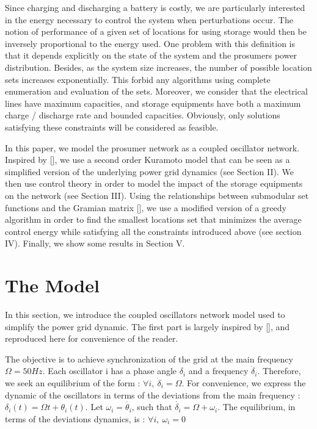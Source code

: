\documentclass[10pt,twoside%
                ,draft%
        ]{article}
\begin{document}
Since charging and discharging a battery is costly, we are particularly interested in the energy necessary to control the system when perturbations occur. The notion of performance of a given set of locations for using storage would then be inversely proportional to the energy used. One problem with this definition is that it depends explicitly on the state of the system and the prosumers power distribution. Besides, as the system size increases, the number of possible location sets increases exponentially. This forbid any algorithms using complete enumeration and evaluation of the sets.
Moreover, we consider  that the electrical lines have maximum capacities, and storage equipments have both a maximum charge / discharge rate and  bounded capacities. Obviously, only solutions satisfying these constraints will be considered as feasible.



 In this paper, we model the prosumer network as a coupled oscillator network. Inspired by [], we use a second order Kuramoto model that can be seen as a simplified version of the underlying power grid dynamics (see Section II). We then use control theory in order to model the impact of the storage equipments on the network (see Section III). Using the relationships between submodular set functions
and the Gramian matrix [], we use a modified version of a greedy algorithm in order to find the smallest locations set that minimizes the average control energy while satisfying all the constraints introduced above (see section IV).
Finally, we show some results in Section V.\section{The Model}

In this section, we introduce the coupled oscillators network model used to simplify the power grid dynamic. The first part is largely inspired by [], and reproduced here for convenience of the reader.

 The objective is to achieve synchronization of the grid at the main frequency $ \Omega = 50 Hz $. Each oscillator i has a phase angle $ \delta_i $ and a frequency $ \dot{\delta}_i $. Therefore, we seek an equilibrium of the form : $ \forall i,\ \dot{\delta}_i = \Omega $. For convenience, we express the dynamic of the oscillators in terms of the deviations from the main frequency : $ \delta_i(t) = \Omega t + \theta_i(t) $. Let $ \omega_i = \dot{\theta_i} $, such that $ \dot{\delta_i} = \Omega + \omega_i $. The equilibrium, in terms of the deviations dynamics, is : $ \forall i,\ \omega_i = 0 $
\end{document}
